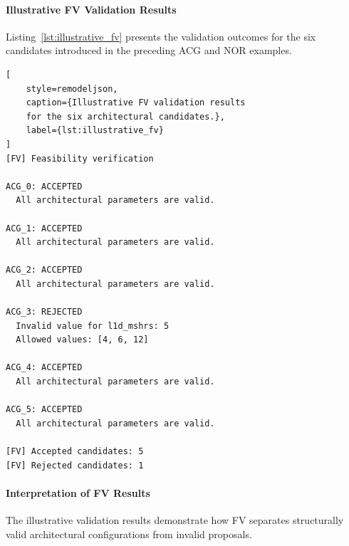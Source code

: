 \paragraph{Illustrative FV Validation Results}

Listing~\ref{lst:illustrative_fv} presents the
validation outcomes for the six candidates
introduced in the preceding ACG and NOR examples.

\begin{lstlisting}[
    style=remodeljson,
    caption={Illustrative FV validation results
    for the six architectural candidates.},
    label={lst:illustrative_fv}
]
[FV] Feasibility verification

ACG_0: ACCEPTED
  All architectural parameters are valid.

ACG_1: ACCEPTED
  All architectural parameters are valid.

ACG_2: ACCEPTED
  All architectural parameters are valid.

ACG_3: REJECTED
  Invalid value for l1d_mshrs: 5
  Allowed values: [4, 6, 12]

ACG_4: ACCEPTED
  All architectural parameters are valid.

ACG_5: ACCEPTED
  All architectural parameters are valid.

[FV] Accepted candidates: 5
[FV] Rejected candidates: 1
\end{lstlisting}

\paragraph{Interpretation of FV Results}

The illustrative validation results demonstrate
how FV separates structurally valid architectural
configurations from invalid proposals.

